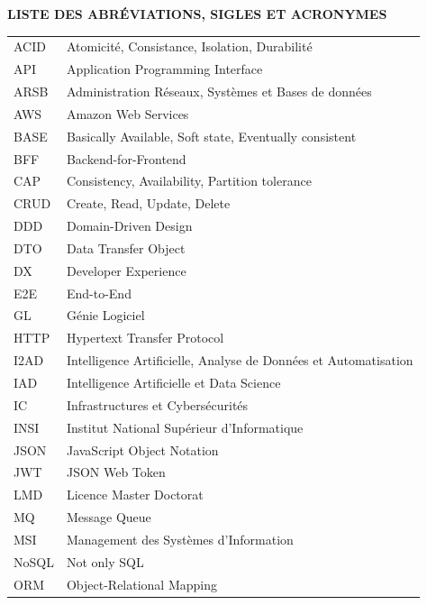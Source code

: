 \thispagestyle{normalpage}

\begin{center}
    {\large\bfseries LISTE DES ABRÉVIATIONS, SIGLES ET ACRONYMES}
\end{center}
\label{page:abreviations}

\begin{longtable}[l]{p{4cm} p{11cm}}
        ACID & Atomicité, Consistance, Isolation, Durabilité \\
        API & Application Programming Interface \\
        ARSB & Administration Réseaux, Systèmes et Bases de données \\
        AWS & Amazon Web Services \\
        BASE & Basically Available, Soft state, Eventually consistent \\
        BFF & Backend-for-Frontend \\
        CAP & Consistency, Availability, Partition tolerance \\
        CRUD & Create, Read, Update, Delete \\
        DDD & Domain-Driven Design \\
        DTO & Data Transfer Object \\
        DX & Developer Experience \\
        E2E & End-to-End \\
        GL & Génie Logiciel \\
        HTTP & Hypertext Transfer Protocol \\
        I2AD & Intelligence Artificielle, Analyse de Données et Automatisation \\
        IAD & Intelligence Artificielle et Data Science \\
        IC & Infrastructures et Cybersécurités \\
        INSI & Institut National Supérieur d'Informatique \\
        JSON & JavaScript Object Notation \\
        JWT & JSON Web Token \\
        LMD & Licence Master Doctorat \\
        MQ & Message Queue \\
        MSI & Management des Systèmes d'Information \\
        NoSQL & Not only SQL \\
        ORM & Object-Relational Mapping \\

\end{longtable}
